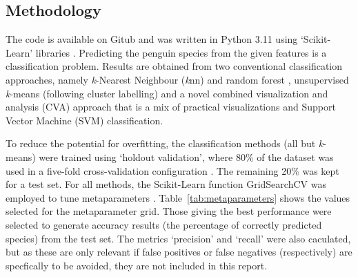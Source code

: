 \documentclass[a4paper, 11pt]{article}
\begin{document}
\subsection*{Methodology}

The code is available on Gitub \cite{TimAIRepo} and was written in Python 3.11 \cite{python311} 
using ‘Scikit-Learn’ libraries \cite{scikit-learn}.
Predicting the penguin species from the given features is a classification problem. 
Results are obtained from two conventional classification approaches, 
namely \textit{k}-Nearest Neighbour (\textit{k}nn) \cite{bishop2006pattern} and random forest \cite{breiman2001random}, 
unsupervised \textit{k}-means (following cluster labelling) \cite{tan2005introduction} 
and a novel combined visualization and analysis (CVA) approach that is a mix of 
practical visualizations and Support Vector Machine (SVM) classification.

To reduce the potential for overfitting, the classification methods (all but \textit{k}-means) were trained using 
`holdout validation', where 80\% of the dataset was used in a five-fold cross-validation 
configuration \cite{james2013introduction}. The remaining 20\% was kept for a test set. For all methods, 
the Scikit-Learn function GridSearchCV was employed to tune metaparameters \cite{scikit-learn}. 
Table~\ref{tab:metaparameters} shows the values selected for the metaparameter grid. Those giving the best 
performance were selected to generate accuracy results (the percentage of correctly predicted species) 
from the test set. The metrics `precision' and `recall' were also caculated, but as 
these are only relevant if false positives or false negatives (respectively) are specfically to be avoided, 
they are not included in this report.   
\end{document}
